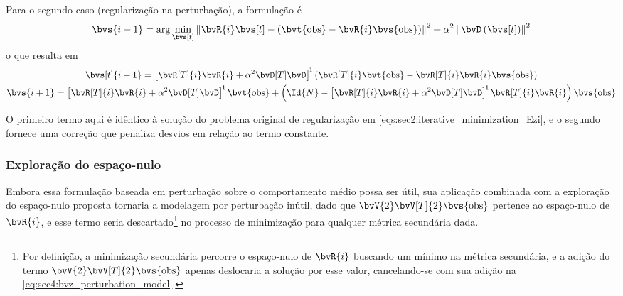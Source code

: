 Para o segundo caso (regularização na perturbação), a formulação é
\begin{equation}
	\bvs{i+1} = \arg\min_{\bvs[t]} \norm{\bvR{i} \bvs[t] - \pts{\bvt{\obs} - \bvR{i} \bvs{\obs}}}^2 + \alpha^2\norm{\bvD \pts{\bvs[t]}}^2 
	\label{eq:sec3:minimization_perturbation-with-regularization_formulation}
\end{equation}
o que resulta em
\begin{subequations}
	\begin{gather}
		\bvs[t]{i+1} = \inv*{\bvR[T]{i} \bvR{i} + \alpha^2 \bvD[T] \bvD} \pts{\bvR[T]{i} \bvt{\obs} - \bvR[T]{i} \bvR{i} \bvs{\obs}} \\
		\bvs{i+1} = \inv*{\bvR[T]{i} \bvR{i} + \alpha^2 \bvD[T] \bvD} \bvt{\obs} + \pts{\Id{N} - \inv*{\bvR[T]{i} \bvR{i} + \alpha^2 \bvD[T] \bvD} \bvR[T]{i} \bvR{i}} \bvs{\obs}
	\end{gather}
\end{subequations}

O primeiro termo aqui é idêntico à solução do problema original de regularização em \cref{eqs:sec2:iterative_minimization_Ezi}, e o segundo fornece uma correção que penaliza desvios em relação ao termo constante.

\subsubsection{Exploração do espaço-nulo}

Embora essa formulação baseada em perturbação sobre o comportamento médio possa ser útil, sua aplicação combinada com a exploração do espaço-nulo proposta tornaria a modelagem por perturbação inútil, dado que $\bvV{2}\bvV[T]{2} \bvs{\obs}$ pertence ao espaço-nulo de $\bvR{i}$, e esse termo seria descartado\footnote{Por definição, a minimização secundária percorre o espaço-nulo de $\bvR{i}$ buscando um mínimo na métrica secundária, e a adição do termo $\bvV{2}\bvV[T]{2} \bvs{\obs}$ apenas deslocaria a solução por esse valor, cancelando-se com sua adição na \cref{eq:sec4:bvz_perturbation_model}.} no processo de minimização para qualquer métrica secundária dada.

